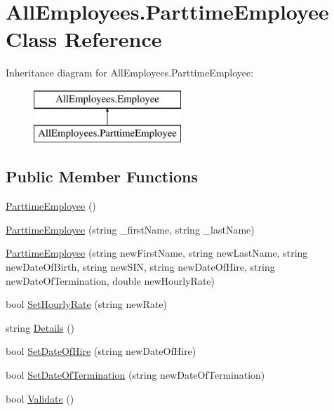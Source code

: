\hypertarget{class_all_employees_1_1_parttime_employee}{}\section{All\+Employees.\+Parttime\+Employee Class Reference}
\label{class_all_employees_1_1_parttime_employee}
Inheritance diagram for All\+Employees.\+Parttime\+Employee\+:\begin{figure}[H]
\begin{center}
\leavevmode
\includegraphics[height=2.000000cm]{class_all_employees_1_1_parttime_employee}
\end{center}
\end{figure}
\subsection*{Public Member Functions}
\begin{DoxyCompactItemize}
\item 
\hyperlink{class_all_employees_1_1_parttime_employee_aefdb20ed1cc9fb007068380a97e3f51e}{Parttime\+Employee} ()
\item 
\hyperlink{class_all_employees_1_1_parttime_employee_a262b933303b5a3b13d272924b48c8cc5}{Parttime\+Employee} (string \+\_\+first\+Name, string \+\_\+last\+Name)
\item 
\hyperlink{class_all_employees_1_1_parttime_employee_a350cff7a883b488dce0935dfb373086d}{Parttime\+Employee} (string new\+First\+Name, string new\+Last\+Name, string new\+Date\+Of\+Birth, string new\+S\+I\+N, string new\+Date\+Of\+Hire, string new\+Date\+Of\+Termination, double new\+Hourly\+Rate)
\item 
bool \hyperlink{class_all_employees_1_1_parttime_employee_acfdba5c7f4398a694c9399de3bb2748f}{Set\+Hourly\+Rate} (string new\+Rate)
\item 
string \hyperlink{class_all_employees_1_1_parttime_employee_aab5cb221e05fda2cbac3d3ecb1398595}{Details} ()
\item 
bool \hyperlink{class_all_employees_1_1_parttime_employee_a51e1c286875fb3b62a0ad41297e67ae5}{Set\+Date\+Of\+Hire} (string new\+Date\+Of\+Hire)
\item 
bool \hyperlink{class_all_employees_1_1_parttime_employee_aec0beae39ae4a709c93f5a6bc22bdcb5}{Set\+Date\+Of\+Termination} (string new\+Date\+Of\+Termination)
\item 
bool \hyperlink{class_all_employees_1_1_parttime_employee_ae9dfe4fa4f371c46c853cb499da663e7}{Validate} ()
\end{DoxyCompactItemize}
